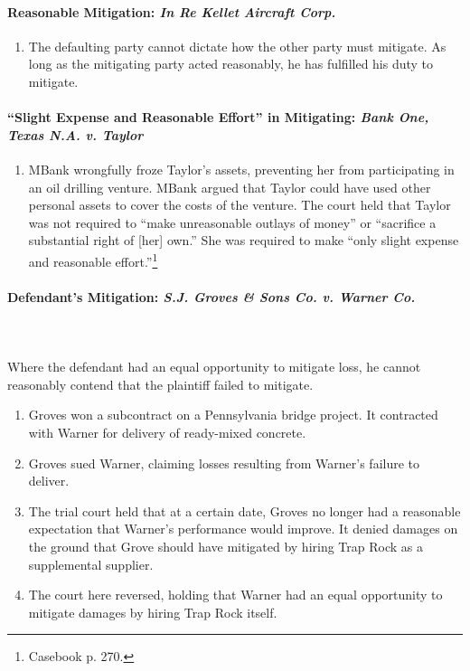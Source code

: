 \paragraph{Reasonable Mitigation: \emph{In Re Kellet Aircraft Corp.}}

\begin{enumerate}
    \item The defaulting party cannot dictate how the other party must 
    mitigate. As long as the mitigating party acted reasonably, he has 
    fulfilled his duty to mitigate.
\end{enumerate}

\paragraph{``Slight Expense and Reasonable Effort'' in Mitigating: \emph{Bank 
One, Texas N.A. v. Taylor}}

\begin{enumerate}
    \item MBank wrongfully froze Taylor's assets, preventing her from 
    participating in an oil drilling venture. MBank argued that Taylor could 
    have used other personal assets to cover the costs of the venture. The 
    court held that Taylor was not required to ``make unreasonable outlays of 
    money'' or ``sacrifice a substantial right of [her] 
    own.'' She was required to make ``only slight expense and reasonable 
    effort.''\footnote{Casebook p. 270.}
\end{enumerate}

\paragraph{Defendant's Mitigation: \emph{S.J. Groves \& Sons Co. v. Warner 
Co.}}
~\\\\
Where the defendant had an equal opportunity to mitigate loss, he cannot 
reasonably contend that the plaintiff failed to mitigate.

\begin{enumerate}
    \item Groves won a subcontract on a Pennsylvania bridge project. It 
    contracted with Warner for delivery of ready-mixed concrete.
    \item Groves sued Warner, claiming losses resulting from Warner's failure 
    to deliver.
    \item The trial court held that at a certain date, Groves no longer had a 
    reasonable expectation that Warner's performance would improve. It denied 
    damages on the ground that Grove should have mitigated by hiring Trap 
    Rock as a supplemental supplier.
    \item The court here reversed, holding that Warner had an equal 
    opportunity to mitigate damages by hiring Trap Rock itself.
\end{enumerate}


